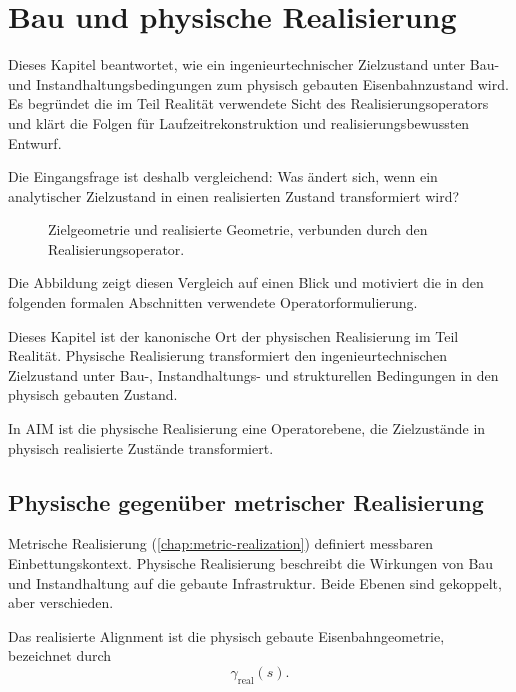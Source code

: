 \chapter{Bau und physische Realisierung}
\label{chap:construction-and-realization}

Dieses Kapitel beantwortet, wie ein ingenieurtechnischer Zielzustand unter
Bau- und Instandhaltungsbedingungen zum physisch gebauten Eisenbahnzustand
wird. Es begründet die im Teil Realität verwendete Sicht des
Realisierungsoperators und klärt die Folgen für Laufzeitrekonstruktion und
realisierungsbewussten Entwurf.

Die Eingangsfrage ist deshalb vergleichend: Was ändert sich, wenn ein
analytischer Zielzustand in einen realisierten Zustand transformiert wird?

\begin{figure}[htbp]
\centering

\caption{Zielgeometrie und realisierte Geometrie, verbunden durch den Realisierungsoperator.}
\label{fig:target-vs-realized-geometry}
\end{figure}

Die Abbildung zeigt diesen Vergleich auf einen Blick und motiviert die in den
folgenden formalen Abschnitten verwendete Operatorformulierung.

Dieses Kapitel ist der kanonische Ort der physischen Realisierung im Teil
Realität. Physische Realisierung transformiert den ingenieurtechnischen
Zielzustand unter Bau-, Instandhaltungs- und strukturellen Bedingungen in den
physisch gebauten Zustand.

\begin{principle}[Realisierungsprinzip]
\label{princ:realization-principle}
In AIM ist die physische Realisierung eine Operatorebene, die Zielzustände in
physisch realisierte Zustände transformiert.
\end{principle}

\section{Physische gegenüber metrischer Realisierung}

Metrische Realisierung (\cref{chap:metric-realization}) definiert messbaren
Einbettungskontext. Physische Realisierung beschreibt die Wirkungen von Bau
und Instandhaltung auf die gebaute Infrastruktur. Beide Ebenen sind gekoppelt,
aber verschieden.

\begin{definition}
\label{def:realized-alignment}
Das realisierte Alignment ist die physisch gebaute Eisenbahngeometrie,
bezeichnet durch
\[
\gamma_{\mathrm{real}}(s).
\]
\end{definition}

